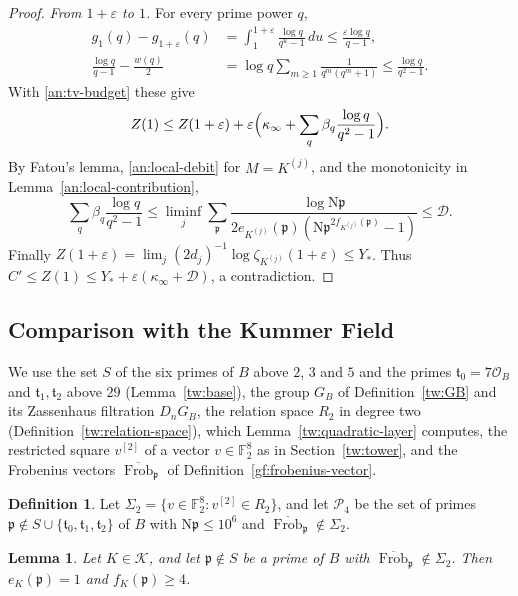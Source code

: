 \documentclass[11pt]{amsart}
\numberwithin{equation}{section}
\newtheorem{lemma}[equation]{Lemma}
\theoremstyle{definition}
\newtheorem{definition}[equation]{Definition}
\theoremstyle{remark}
\DeclareMathOperator{\Frob}{Frob}
\newcommand{\Ftwo}{\mathbb F_2}
\begin{document}
\begin{proof}
\emph{From $1+\varepsilon$ to $1$.} For every prime power $q$,
\begin{align*}
 g_1(q)-g_{1+\varepsilon}(q)&=\int_1^{1+\varepsilon}\frac{\log q}{q^u-1}\,du
 \le\frac{\varepsilon\log q}{q-1},\\
 \frac{\log q}{q-1}-\frac{w(q)}2&=\log q\sum_{m\ge1}\frac1{q^m(q^m+1)}
 \le\frac{\log q}{q^2-1}.
\end{align*}
With \eqref{an:tv-budget} these give
\[
 Z(1)\le Z(1+\varepsilon)
 +\varepsilon\Bigl(\kappa_\infty+\sum_q\beta_q\frac{\log q}{q^2-1}\Bigr).
\]
By Fatou's lemma, \eqref{an:local-debit} for $M=K^{(j)}$, and the monotonicity
in Lemma~\ref{an:local-contribution},
\[
 \sum_q\beta_q\frac{\log q}{q^2-1}
 \le\liminf_j\sum_{\mathfrak p}\frac{\log\mathrm N\mathfrak p}
 {2e_{K^{(j)}}(\mathfrak p)(\mathrm N\mathfrak p^{2f_{K^{(j)}}(\mathfrak p)}-1)}
 \le\mathcal D.
\]
Finally
$Z(1+\varepsilon)=\lim_j(2d_j)^{-1}\log\zeta_{K^{(j)}}(1+\varepsilon)\le Y_*$.
Thus $C'\le Z(1)\le Y_*+\varepsilon(\kappa_\infty+\mathcal D)$, a
contradiction.
\end{proof}

\subsection{Comparison with the Kummer Field}\label{an:comparison}
We use the set $S$ of the six primes of $B$ above $2$, $3$ and $5$ and the
primes $\mathfrak t_0=7\mathcal O_B$ and $\mathfrak t_1,\mathfrak t_2$ above
$29$ (Lemma~\ref{tw:base}), the group $G_B$ of Definition~\ref{tw:GB} and
its Zassenhaus filtration $D_nG_B$, the relation space $R_2$ in degree two
(Definition~\ref{tw:relation-space}), which Lemma~\ref{tw:quadratic-layer}
computes, the restricted square $v^{[2]}$ of a vector $v\in\Ftwo^8$ as in
Section~\ref{tw:tower}, and the Frobenius vectors
$\overline{\Frob}_{\mathfrak p}$ of Definition~\ref{gf:frobenius-vector}.

\begin{definition}\label{an:P4}
Let $\Sigma_2=\{v\in\Ftwo^8:v^{[2]}\in R_2\}$, and let $\mathcal P_4$ be the
set of primes $\mathfrak p\notin S\cup\{\mathfrak t_0,\mathfrak
t_1,\mathfrak t_2\}$ of $B$ with $\mathrm N\mathfrak p\le10^6$ and
$\overline{\Frob}_{\mathfrak p}\notin\Sigma_2$.
\end{definition}

\begin{lemma}\label{an:census-degree}
Let $K\in\mathcal K$, and let $\mathfrak p\notin S$ be a prime of $B$ with
$\overline{\Frob}_{\mathfrak p}\notin\Sigma_2$. Then $e_K(\mathfrak p)=1$ and
$f_K(\mathfrak p)\ge4$.
\end{lemma}
\end{document}
